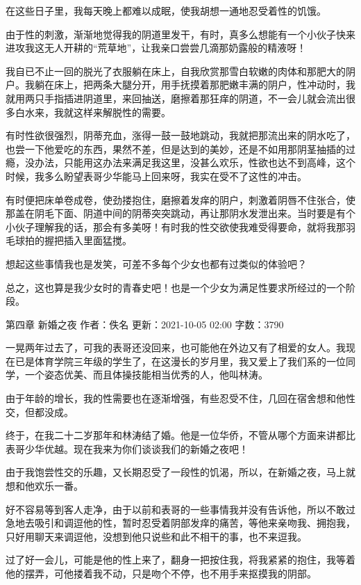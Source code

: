 \documentclass[12pt,UTF8]{ctexbook}
\begin{document}
在这些日子里，我每天晚上都难以成眠，使我胡想一通地忍受着性的饥饿。

由于性的刺激，渐渐地觉得我的阴道里发干，有时，真多么想能有一个小伙子快来进攻我这无人开耕的“荒草地”，让我亲口尝尝几滴那奶露般的精液呀！

我自已不止一回的脱光了衣服躺在床上，自我欣赏那雪白软嫩的肉体和那肥大的阴户。我躺在床上，把两条大腿分开，用手抚摸着那肥嫩丰满的阴户，性冲动时，我就用两只手指插进阴道里，来回抽送，磨擦着那狂痒的阴道，不一会儿就会流出很多白水来，我就这样来解脱性的需要。

有时性欲很强烈，阴蒂充血，涨得一鼓一鼓地跳动，我就把那流出来的阴水吃了，也尝一下他爱吃的东西，果然不差，但是达到的美妙，还是不如用那阴茎抽插的过瘾，没办法，只能用这办法来满足我这里，没甚么欢乐，性欲也达不到高峰，这个时候，我多么盼望表哥少华能马上回来呀，我实在受不了这性的冲击。

有时便把床单卷成卷，使劲搂抱住，磨擦着发痒的阴户，刺激着阴唇不住张合，使那盖在阴毛下面、阴道中间的阴蒂突突跳动，再让那阴水发泄出来。当时要是有个小伙子理解我的话，那会有多美呀！有时我的性交欲使我难受得要命，就将我那羽毛球拍的握把插入里面猛搅。

想起这些事情我也是发笑，可差不多每个少女也都有过类似的体验吧？

总之，这也算是我少女时的青春史吧！也是一个少女为满足性要求所经过的一个阶段。

第四章 新婚之夜
作者：佚名      更新：2021-10-05 02:00      字数：3790

一晃两年过去了，可我的表哥还没回来，也可能他在外边又有了相爱的女人。我现在已是体育学院三年级的学生了，在这漫长的岁月里，我又爱上了我们系的一位同学，一个姿态优美、而且体操技能相当优秀的人，他叫林涛。

由于年龄的增长，我的性需要也在逐渐增强，有些忍受不住，几回在宿舍想和他性交，但都没成。

终于，在我二十二岁那年和林涛结了婚。他是一位华侨，不管从哪个方面来讲都比表哥少华优越。现在我来为你们谈谈我们的新婚之夜吧！

由于我饱尝性交的乐趣，又长期忍受了一段性的饥渴，所以，在新婚之夜，马上就想和他欢乐一番。

好不容易等到客人走净，由于以前和表哥的一些事情我并没有告诉他，所以不敢过急地去吸引和调逗他的性，暂时忍受着阴部发痒的痛苦，等他来亲吻我、拥抱我，只好用聊天来调逗他，没想到他只说些和此不相干的事，也不来逗我。

过了好一会儿，可能是他的性上来了，翻身一把按住我，将我紧紧的抱住，我等着他的摆弄，可他搂着我不动，只是吻个不停，也不用手来抠摸我的阴部。
\end{document}
